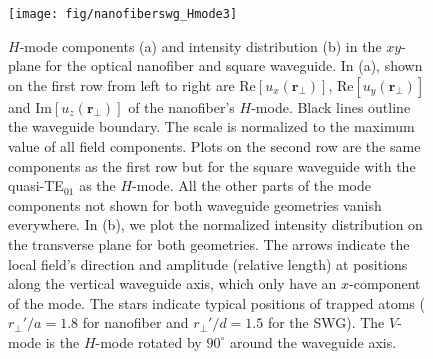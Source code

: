 \documentclass[preprint,aps,pra,onecolumn,superscriptaddress]{revtex4-1} %
\def\br{\mathbf{r}}
\begin{document}
\begin{figure}[htb]
\centering
  \texttt{[image: fig/nanofiberswg\_Hmode3]}
  \caption{$H$-mode components (a) and intensity distribution (b) in the $ xy $-plane for the optical nanofiber and square waveguide. In (a), shown on the first row from left to right are $ \mathrm{Re}[u_x(\br\!_\perp)] $, $ \mathrm{Re}[u_y(\br\!_\perp)] $ and $ \mathrm{Im}[u_z(\br\!_\perp)] $ of the nanofiber's $ H $-mode. Black lines outline the waveguide boundary. The scale is normalized to the maximum value of all field components. Plots on the second row are the same components as the first row but for the square waveguide with the quasi-TE$_{01}$ as the $ H $-mode. All the other parts of the mode components not shown for both waveguide geometries vanish everywhere. In (b), we plot the normalized intensity distribution on the transverse plane for both geometries. The arrows indicate the local field's direction and amplitude (relative length) at positions along the vertical waveguide axis, which only have an $ x $-component of the mode. The stars indicate typical positions of trapped atoms ($r\!_\perp'/a=1.8  $ for nanofiber and $ r\!_\perp'/d=1.5 $ for the SWG). The $ V $-mode is the $ H $-mode rotated by $ 90^\circ $ around the waveguide axis. }\label{fig:nanofiberSWG_E_ints}
\end{figure}
\end{document}
